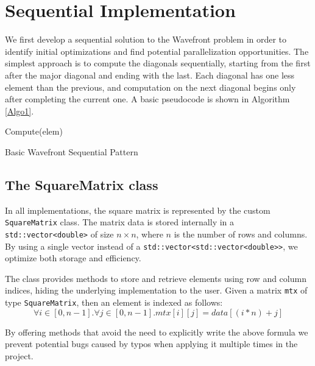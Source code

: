 \section*{Sequential Implementation}
We first develop a sequential solution to the Wavefront problem in order to identify initial optimizations and find potential parallelization opportunities. The simplest approach is to compute the diagonals sequentially, starting from the first after the major diagonal and ending with the last. Each diagonal has one less element than the previous, and computation on the next diagonal begins only after completing the current one. A basic pseudocode is shown in Algorithm \ref{Algo1}.  

\begin{algorithm}
\begin{algorithmic}
        \STATE Compute(elem)
    \ENDFOR
\ENDFOR
\end{algorithmic}
\caption{Basic Wavefront Sequential Pattern}
\label{Algo1}
\end{algorithm}


\subsection*{The SquareMatrix class}
\par 
In all implementations, the square matrix is represented by the custom \texttt{SquareMatrix} class. The matrix data is stored internally in a \texttt{std::vector<double>} of size $n \times n$, where $n$ is the number of rows and columns. By using a single vector instead of a \texttt{std::vector<std::vector<double>>}, we optimize both storage and efficiency.

\par The class provides methods to store and retrieve elements using row and column indices, hiding the underlying implementation to the user. Given a matrix \texttt{mtx} of type \texttt{SquareMatrix}, then an element is indexed as follows:
\begin{equation}
    \forall i \in [0, n - 1]. \forall j \in [0, n - 1]. mtx[i][j] = data[(i * n) + j]
\end{equation}

By offering methods that avoid the need to explicitly write the above formula we prevent potential bugs caused by typos when applying it multiple times in the project.

